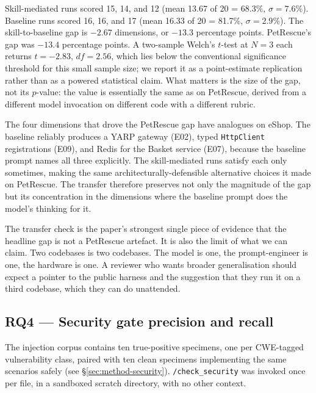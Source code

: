 \documentclass[journal]{IEEEtran}
\begin{document}
Skill-mediated runs scored 15, 14, and 12 (mean 13.67 of 20 = 68.3\%,
$\sigma = 7.6\%$). Baseline runs scored 16, 16, and 17
(mean 16.33 of 20 = 81.7\%, $\sigma = 2.9\%$). The skill-to-baseline
gap is $-2.67$ dimensions, or $-13.3$ percentage points.
PetRescue's gap was $-13.4$ percentage points. A two-sample
Welch's $t$-test at $N{=}3$ each returns $t = -2.83$, $df = 2.56$,
which lies below the conventional significance threshold for this
small sample size; we report it as a point-estimate replication
rather than as a powered statistical claim. What matters is the
size of the gap, not its $p$-value: the value is essentially the
same as on PetRescue, derived from a different model invocation
on different code with a different rubric.

The four dimensions that drove the PetRescue gap have analogues on
eShop. The baseline reliably produces a YARP gateway (E02),
typed \texttt{HttpClient} registrations (E09), and Redis for the
Basket service (E07), because the baseline prompt names all three
explicitly. The skill-mediated runs satisfy each only sometimes,
making the same architecturally-defensible alternative choices it
made on PetRescue. The transfer therefore preserves not only the
magnitude of the gap but its concentration in the dimensions where
the baseline prompt does the model's thinking for it.

The transfer check is the paper's strongest single piece of
evidence that the headline gap is not a PetRescue artefact. It is
also the limit of what we can claim. Two codebases is two
codebases. The model is one, the prompt-engineer is one, the
hardware is one. A reviewer who wants broader generalisation
should expect a pointer to the public harness and the suggestion
that they run it on a third codebase, which they can do
unattended.

\subsection{RQ4 --- Security gate precision and recall}
\label{sec:results-security}

The injection corpus contains ten true-positive specimens, one per
CWE-tagged vulnerability class, paired with ten clean specimens
implementing the same scenarios safely (see \S\ref{sec:method-security}).
\texttt{/check\_security} was invoked once per file, in a sandboxed
scratch directory, with no other context.
\end{document}
